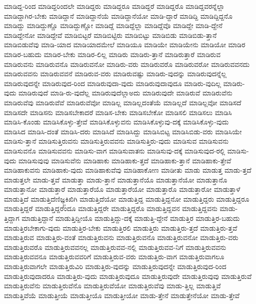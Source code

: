 {ಮಾಡಿದ್ದ-ರಿಂದ
ಮಾಡಿದ್ದರಿಂದಲೇ
ಮಾಡಿದ್ದರು
ಮಾಡಿದ್ದರೂ
ಮಾಡಿದ್ದರೆ
ಮಾಡಿದ್ದರೊ
ಮಾಡಿದ್ದವರನ್ನೆಲ್ಲಾ
ಮಾಡಿದ್ದಾಗಿರ-ಬೇಕು
ಮಾಡಿದ್ದಾನೆ
ಮಾಡಿದ್ದಾನೆಯೆ
ಮಾಡಿದ್ದಾನೆಯೋ
ಮಾಡಿ-ದ್ದಾರೆ
ಮಾಡಿದ್ದಿ
ಮಾಡಿದ್ದಿದ್ದನೊ
ಮಾಡಿದ್ದು
ಮಾಡಿದ್ದುಣ್ಣೊ
ಮಾಡಿದ್ದುಣ್ಣೋ
ಮಾಡಿದ್ದೆ
ಮಾಡಿದ್ದೆಲ್ಲಾ
ಮಾಡಿದ್ದೆವೊ
ಮಾಡಿದ್ದೇ
ಮಾಡಿ-ದ್ದೇನೆ
ಮಾಡಿದ್ದೇನೋ
ಮಾಡಿದ್ದೇವೆ
ಮಾಡಿಬಿಟ್ಟರೆ
ಮಾಡಿಬಿಟ್ಟಿರು
ಮಾಡಿಬಿಟ್ಟು
ಮಾಡಿಬಿಡು
ಮಾಡಿಬಿಡು-ತ್ತಾನೆ
ಮಾಡಿಬಿಡುವೆವು
ಮಾಡಿ-ಯಾದ
ಮಾಡಿಯಾದಮೇಲೆ
ಮಾಡಿಯೂ
ಮಾಡಿಯೇ
ಮಾಡಿಯೇನು
ಮಾಡಿಯೋ
ಮಾಡಿರ
ಮಾಡಿರ-ಬಹುದು
ಮಾಡಿರ-ಬೇಕು
ಮಾಡಿರ-ಲಿಲ್ಲ
ಮಾಡಿರು
ಮಾಡಿರು-ತ್ತಾನೆ
ಮಾಡಿರುತ್ತಾರೆ
ಮಾಡಿರುವ
ಮಾಡಿರುವನು
ಮಾಡಿರುವನೊ
ಮಾಡಿರುವನೋ
ಮಾಡಿರು-ವರು
ಮಾಡಿರುವರೊ
ಮಾಡಿರುವರೋ
ಮಾಡಿರುವವನದು
ಮಾಡಿರುವವನು
ಮಾಡಿರುವವನೆ
ಮಾಡಿರುವ-ವರು
ಮಾಡಿರುವಷ್ಟು
ಮಾಡಿರು-ವುದನ್ನು
ಮಾಡಿರುವುದನ್ನೆಲ್ಲ
ಮಾಡಿರುವುದನ್ನೇ
ಮಾಡಿರುವುದ-ರಿಂದ
ಮಾಡಿರುವುದಾ-ವುದು
ಮಾಡಿರುವುದಾವುದೂ
ಮಾಡಿರು-ವುದಿಲ್ಲ
ಮಾಡಿರು-ವುದು
ಮಾಡಿರುವುದೆ
ಮಾಡಿ-ರು-ವುದೆಲ್ಲ
ಮಾಡಿರುವುದೆಲ್ಲಾಅದು
ಮಾಡಿರುವುದೇ
ಮಾಡಿರುವೆ
ಮಾಡಿರುವೆನು
ಮಾಡಿರುವೆವು
ಮಾಡಿರುವೆವೆ
ಮಾಡಿರುವೆವೋ
ಮಾಡಿಲ್ಲ
ಮಾಡಿಲ್ಲದಂತೆಯೆ
ಮಾಡಿಲ್ಲದೆ
ಮಾಡಿಲ್ಲವೋ
ಮಾಡಿಸದೆ
ಮಾಡಿಸದೇ
ಮಾಡಿಸನು
ಮಾಡಿಸಬೇಕಾದರೆ
ಮಾಡಿಸ-ಬೇಕು
ಮಾಡಿಸಬೇಕೋ
ಮಾಡಿಸಲಿ
ಮಾಡಿಸಲು
ಮಾಡಿಸಿ
ಮಾಡಿಸಿ-ಕೊಂಡು
ಮಾಡಿಸಿಕೊಳ್ಳು-ತ್ತೇವೆ
ಮಾಡಿಸಿಕೊಳ್ಳುವನು
ಮಾಡಿಸಿಕೊಳ್ಳುವು-ದಕ್ಕೆ
ಮಾಡಿಸಿಕೊಳ್ಳು-ವುದು
ಮಾಡಿಸಿದ
ಮಾಡಿಸಿ-ದಂತೆ
ಮಾಡಿಸಿ-ದರು
ಮಾಡಿಸಿದೆ
ಮಾಡಿಸಿದ್ದು
ಮಾಡಿಸಿಬಿಟ್ಟ
ಮಾಡಿಸಿಬಿಡು-ವರು
ಮಾಡಿಸಿಯೇ
ಮಾಡಿಸು-ತ್ತಾನೆ
ಮಾಡಿಸುತ್ತಿರುವನು
ಮಾಡಿಸುತ್ತಿರುವವನು
ಮಾಡಿಸುತ್ತಿರು-ವುದು
ಮಾಡಿಸುವ
ಮಾಡಿಸುವನು
ಮಾಡಿಸುವನೊ
ಮಾಡಿಸುವವನು
ಮಾಡಿಸು-ವಾಗ
ಮಾಡಿಸುವಾತನು
ಮಾಡಿಸುವು-ದಕ್ಕೆ
ಮಾಡಿಸುವುದ-ರಲ್ಲಿ
ಮಾಡಿಸು-ವುದು
ಮಾಡಿಸುವುವು
ಮಾಡಿಸುವೆನು
ಮಾಡಿಹಾಕು
ಮಾಡಿಹಾಕು-ತ್ತದೆ
ಮಾಡಿಹಾಕು-ತ್ತಾನೆ
ಮಾಡಿಹಾಕು-ತ್ತೇವೆ
ಮಾಡಿಹಾಕುವನು
ಮಾಡಿಹಾಕು-ವುದು
ಮಾಡಿಹಾಕುವೆವು
ಮಾಡಿಹಾಕೋಣ
ಮಾಡೀತು
ಮಾಡು
ಮಾಡುತ್ತ
ಮಾಡು-ತ್ತದೆ
ಮಾಡುತ್ತಲೇ
ಮಾಡು-ತ್ತವೆ
ಮಾಡುತ್ತಾ
ಮಾಡು-ತ್ತಾನೆ
ಮಾಡುತ್ತಾನೆಯೊ
ಮಾಡುತ್ತಾನೆಯೋ
ಮಾಡುತ್ತಾನೊ
ಮಾಡುತ್ತಾನೋ
ಮಾಡುತ್ತಾರೆ
ಮಾಡುತ್ತಾರೆಯೊ
ಮಾಡುತ್ತಾರೆಯೋ
ಮಾಡುತ್ತಾರೊ
ಮಾಡುತ್ತಾರೋ
ಮಾಡುತ್ತಾಳೆ
ಮಾಡುತ್ತಿದೆ
ಮಾಡುತ್ತಿದೆಣಿಜ್ಞ್ಜಕಿಖಿಗಿ
ಮಾಡುತ್ತಿದೆಯೋ
ಮಾಡುತ್ತಿದ್ದ
ಮಾಡುತ್ತಿದ್ದನೋ
ಮಾಡುತ್ತಿದ್ದರು
ಮಾಡುತ್ತಿದ್ದರೂ
ಮಾಡುತ್ತಿದ್ದರೆ
ಮಾಡುತ್ತಿದ್ದರೆಂದೂ
ಮಾಡುತ್ತಿದ್ದರೇ
ಮಾಡುತ್ತಿದ್ದರೊ
ಮಾಡುತ್ತಿದ್ದವನ
ಮಾಡುತ್ತಿದ್ದವನು
ಮಾಡು-ತ್ತಿದ್ದಾಗ
ಮಾಡುತ್ತಿದ್ದಾನೆ
ಮಾಡುತ್ತಿದ್ದೀಯೊ
ಮಾಡುತ್ತಿದ್ದು-ದಕ್ಕೆ
ಮಾಡುತ್ತಿ-ದ್ದೇನೆ
ಮಾಡುತ್ತಿರ
ಮಾಡುತ್ತಿರ-ಬಹುದು
ಮಾಡುತ್ತಿರಬೇಕಾಗು-ವುದು
ಮಾಡುತ್ತಿರ-ಬೇಕು
ಮಾಡುತ್ತಿರಲಿ
ಮಾಡುತ್ತಿರು
ಮಾಡುತ್ತಿರು-ತ್ತದೆ
ಮಾಡುತ್ತಿರು-ತ್ತವೆ
ಮಾಡುತ್ತಿರುವ
ಮಾಡುತ್ತಿರು-ವಂತೆ
ಮಾಡುತ್ತಿರುವನು
ಮಾಡುತ್ತಿರುವನೊ
ಮಾಡುತ್ತಿರುವನೋ
ಮಾಡುತ್ತಿರು-ವರು
ಮಾಡುತ್ತಿರುವರೊ
ಮಾಡುತ್ತಿರುವವನಲ್ಲ
ಮಾಡುತ್ತಿರುವವ-ನಲ್ಲಿ
ಮಾಡುತ್ತಿರುವವ-ನಿಗೆ
ಮಾಡುತ್ತಿರುವವನು
ಮಾಡುತ್ತಿರುವವನೂ
ಮಾಡುತ್ತಿರುವವರಿಗೆ
ಮಾಡುತ್ತಿರುವ-ವರು
ಮಾಡುತ್ತಿರು-ವಾಗ
ಮಾಡುತ್ತಿರುವಾಗಲೂ
ಮಾಡುತ್ತಿರುವಾಗಲೇ
ಮಾಡುತ್ತಿರುವಿರಿ
ಮಾಡುತ್ತಿರು-ವುದನ್ನು
ಮಾಡುತ್ತಿರುವುದನ್ನೇ
ಮಾಡುತ್ತಿರುವುದ-ರಿಂದ
ಮಾಡುತ್ತಿರುವುದಾದರೂ
ಮಾಡುತ್ತಿರು-ವುದು
ಮಾಡುತ್ತಿರುವುದೂ
ಮಾಡುತ್ತಿರುವುದೇ
ಮಾಡುತ್ತಿರುವುವು
ಮಾಡುತ್ತಿರುವೆ
ಮಾಡುತ್ತಿರುವೆನು
ಮಾಡುತ್ತಿರುವೆನೊ
ಮಾಡುತ್ತಿರುವೆಯೋ
ಮಾಡುತ್ತಿರುವೆವು
ಮಾಡು-ತ್ತಿಲ್ಲ
ಮಾಡುತ್ತಿವೆ
ಮಾಡುತ್ತಿವೆಯೆ
ಮಾಡುತ್ತೀಯೆ
ಮಾಡುತ್ತೀಯೊ
ಮಾಡುತ್ತೀಯೋ
ಮಾಡು-ತ್ತೇನೆ
ಮಾಡುತ್ತೇನೆಯೋ
ಮಾಡು-ತ್ತೇವೆ
}
